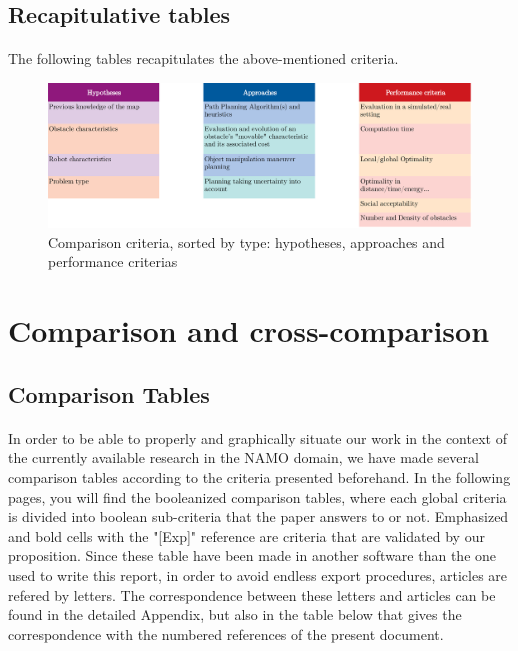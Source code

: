 \subsection{Recapitulative tables}

\paragraph{} The following tables recapitulates the above-mentioned criteria.

\begin{figure}[H]
\centering
\includegraphics[width=15cm]{Comparison_Table/01_comparison_criteria}
\decoRule
\caption[Comparison criteria listing]{Comparison criteria, sorted by type: hypotheses, approaches and performance criterias}
\label{fig:comparison_criteria}
\end{figure}

\clearpage

\section{Comparison and cross-comparison}

\subsection{Comparison Tables}

\paragraph{} In order to be able to properly and graphically situate our work in the context of the currently available research in the NAMO domain, we have made several comparison tables according to the criteria presented beforehand. In the following pages, you will find the booleanized comparison tables, where each global criteria is divided into boolean sub-criteria that the paper answers to or not. Emphasized and bold cells with the "[Exp]" reference are criteria that are validated by our proposition. Since these table have been made in another software than the one used to write this report, in order to avoid endless export procedures, articles are refered by letters. The correspondence between these letters and articles can be found in the detailed  Appendix, but also in the table below that gives the correspondence with the numbered references of the present document.

